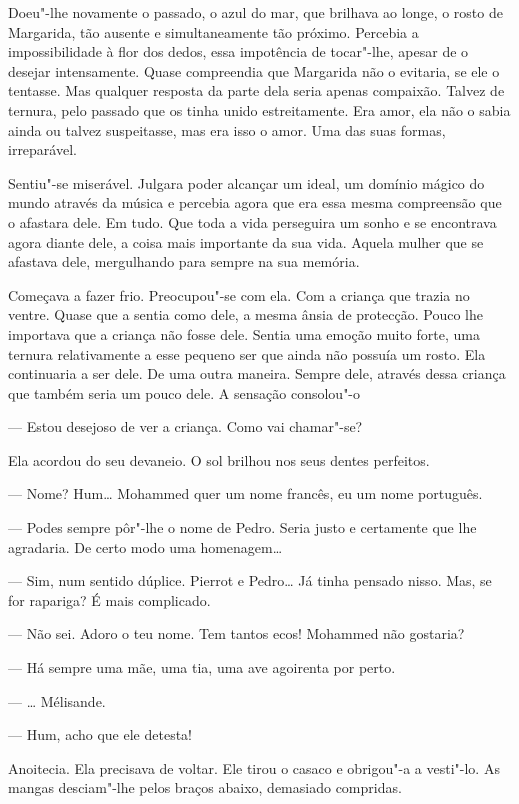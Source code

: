 Doeu"-lhe novamente o passado, o azul do mar, que brilhava ao longe, o
rosto de Margarida, tão ausente e simultaneamente tão próximo. Percebia
a impossibilidade à flor dos dedos, essa impotência de tocar"-lhe, apesar
de o desejar intensamente. Quase compreendia que Margarida não o
evitaria, se ele o tentasse. Mas qualquer resposta da parte dela seria
apenas compaixão. Talvez de ternura, pelo passado que os tinha unido
estreitamente. Era amor, ela não o sabia ainda ou talvez suspeitasse,
mas era isso o amor. Uma das suas formas, irreparável.

Sentiu"-se miserável. Julgara poder alcançar um ideal, um domínio mágico
do mundo através da música e percebia agora que era essa mesma
compreensão que o afastara dele. Em tudo. Que toda a vida perseguira um
sonho e se encontrava agora diante dele, a coisa mais importante da sua
vida. Aquela mulher que se afastava dele, mergulhando para sempre na sua
memória.

Começava a fazer frio. Preocupou"-se com ela. Com a criança que trazia no
ventre. Quase que a sentia como dele, a mesma ânsia de protecção. Pouco
lhe importava que a criança não fosse dele. Sentia uma emoção muito
forte, uma ternura relativamente a esse pequeno ser que ainda não
possuía um rosto. Ela continuaria a ser dele. De uma outra maneira.
Sempre dele, através dessa criança que também seria um pouco dele. A
sensação consolou"-o

--- Estou desejoso de ver a criança. Como vai chamar"-se?

Ela acordou do seu devaneio. O sol brilhou nos seus dentes perfeitos.

--- Nome? Hum\ldots{} Mohammed quer um nome francês, eu um nome português.

--- Podes sempre pôr"-lhe o nome de Pedro. Seria justo e certamente que lhe
agradaria. De certo modo uma homenagem\ldots{}

--- Sim, num sentido dúplice. Pierrot e Pedro\ldots{} Já tinha pensado nisso.
Mas, se for rapariga? É mais complicado.

--- Não sei. Adoro o teu nome. Tem tantos ecos! Mohammed não gostaria?

--- Há sempre uma mãe, uma tia, uma ave agoirenta por perto.

--- \ldots{} Mélisande.

--- Hum, acho que ele detesta!

Anoitecia. Ela precisava de voltar. Ele tirou o casaco e obrigou"-a a
vesti"-lo. As mangas desciam"-lhe pelos braços abaixo, demasiado
compridas.

